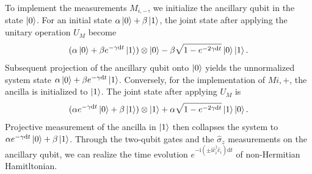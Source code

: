 \documentclass[longbibliography, aps, prx, amsmath, amssymb, amsfonts, twocolumn,superscriptaddress, footinbib]{revtex4-1}
\begin{document}
	To implement the measurements $M_{i,-}$, we initialize the ancillary qubit in the state $\ket{0}$. For an initial state $\alpha \ket{0} + \beta \ket{1}$, the joint state after applying the unitary operation $U_M$ become
	\begin{equation}
		(\alpha \ket{0} + \beta e^{-\gamma \mathrm{d}t} \ket{1}) \otimes \ket{0} - \beta \sqrt{1-e^{-2\gamma\mathrm{d}t}} \ket{0} \ket{1}.
	\end{equation}
	Subsequent projection of the ancillary qubit onto $\ket{0}$ yields the unnormalized system state $\alpha \ket{0} + \beta e^{-\gamma \mathrm{d}t} \ket{1}$. 
	Conversely, for the implementation of $M{i,+}$, the ancilla is initialized to $\ket{1}$. The joint state after applying $U_M$ is
	\begin{equation}
		(\alpha e^{-\gamma \mathrm{d}t} \ket{0} + \beta  \ket{1}) \otimes \ket{1} + \alpha \sqrt{1-e^{-2\gamma\mathrm{d}t}} \ket{1} \ket{0}.
	\end{equation}
	Projective measurement of the ancilla in $\ket{1}$ then collapses the system to $\alpha e^{-\gamma \mathrm{d}t} \ket{0} + \beta  \ket{1}$.
	Through the two-qubit gates and the $\hat{\sigma}_z$ measurements on the ancillary qubit, we can realize the time evolution $e^{-\mathrm{i} (\pm \mathrm{i} \hat{c}_i^{\dagger}\hat{c}_i) \mathrm{d}t}$ of non-Hermitian Hamitltonian.

	
\end{document}
